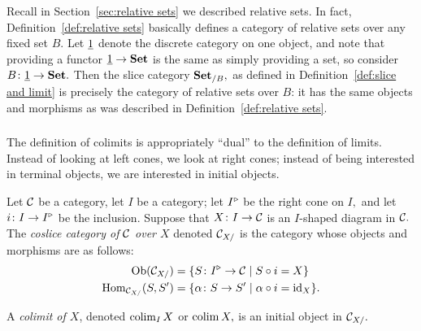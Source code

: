 \documentclass[../main/CT4S-EN-RU]{subfiles}
\begin{document}
\begin{exampleRUS}\label{ex:product version of nat trans}
\end{exampleRUS}

\begin{remarkENG}
Recall in Section~\ref{sec:relative sets} we described relative sets. In fact, Definition~\ref{def:relative sets} basically defines a category of relative sets over any fixed set $B.$ Let $\underline{1}$ denote the discrete category on one object, and note that providing a functor $\underline{1}\rightarrow{\mathbf{Set}}$ is the same as simply providing a set, so consider $B\colon\underline{1}\rightarrow{\mathbf{Set}}.$ Then the slice category ${\mathbf{Set}}_{/B},$ as defined in Definition~\ref{def:slice and limit} is precisely the category of relative sets over $B$: it has the same objects and morphisms as was described in Definition~\ref{def:relative sets}.
\end{remarkENG}

\begin{remarkRUS}
\end{remarkRUS}


\subsubsection{}

\begin{blockENG}
The definition of colimits is appropriately “dual” to the definition of limits. Instead of looking at left cones, we look at right cones; instead of being interested in terminal objects, we are interested in initial objects.
\end{blockENG}

\begin{blockRUS}
\end{blockRUS}

\begin{definitionENG}\label{def:coslice and colimit}
Let $\mathcal{C}$ be a category, let $I$ be a category; let $I^\triangleright$ be the right cone on $I,$ and let $i\colon I\rightarrow I^\triangleright$ be the inclusion. Suppose that $X\colon I\rightarrow\mathcal{C}$ is an $I$-shaped diagram in $\mathcal{C}.$ The {\em coslice category of $\mathcal{C}$ over $X$} denoted $\mathcal{C}_{X/}$ is the category whose objects and morphisms are as follows:
\begin{align*}
\operatorname{Ob}(\mathcal{C}_{X/})&=\{S\colon I^\triangleright\rightarrow\mathcal{C}{\;|\;}S\circ i=X\}\\
\operatorname{Hom}_{\mathcal{C}_{X/}}(S,S')&=\{\alpha\colon S\rightarrow S'{\;|\;}\alpha\circ i=\operatorname{id}_X\}.
\end{align*}

A {\em colimit of $X$}, denoted $\operatorname{colim}_IX$ or $\operatorname{colim} X,$ is an initial object in $\mathcal{C}_{X/}.$
\end{definitionENG}
\end{document}
